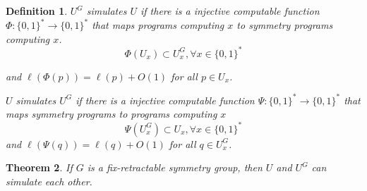 \documentclass{article}
\newtheorem{theorem}{Theorem}[section]
\newtheorem{definition}[theorem]{Definition}
\newcommand{\bin}{\{0,1\}^*} %
\begin{document}
\begin{definition}
    \label{def:simul}
    $U^{G}$ simulates $U$ if there is a injective computable function $\Phi:\bin \to \bin$ that maps programs computing $x$ to symmetry programs computing $x$.
    \begin{equation}
        \Phi(U_x) \subset U^G_x, \forall x \in \bin
    \end{equation}
    
    and $\ell(\Phi(p)) = \ell(p) + O(1)$ for all $p \in U_x$. 
    
    $U$ simulates $U^G$ if there is a injective computable function $\Psi:\bin \to \bin$ that maps symmetry programs to programs computing $x$ 
    \begin{equation}
        \Psi(U^G_x) \subset U_x, \forall x \in \bin
    \end{equation}
    and $\ell(\Psi(q)) = \ell(q) + O(1)$ for all $q \in U^G_x$.
\end{definition}

\begin{theorem}
    \label{thm:simul}
    If $G$ is a fix-retractable symmetry group, then $U$ and $U^G$ can simulate each other.
\end{theorem}
\end{document}
